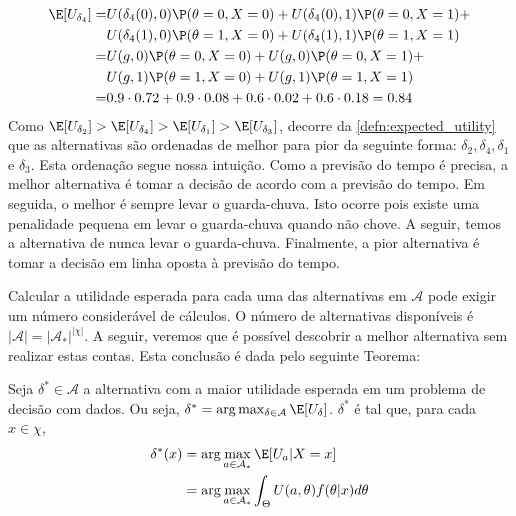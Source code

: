 \begin{example}
\begin{align*}
 \end{align*}
 \begin{align*}
  \E[U_{\delta_{4}}]
  =& U(\delta_{4}(0),0)\P(\theta=0,X=0) +
  U(\delta_{4}(0),1)\P(\theta=0,X=1) + \\
  & U(\delta_{4}(1),0)\P(\theta=1,X=0) +
  U(\delta_{4}(1),1)\P(\theta=1,X=1) \\
  =& U(g,0)\P(\theta=0,X=0) +
  U(g,0)\P(\theta=0,X=1) + \\
  & U(g,1)\P(\theta=1,X=0) +
  U(g,1)\P(\theta=1,X=1) \\
  =& 0.9 \cdot 0.72 + 0.9 \cdot 0.08
  + 0.6 \cdot 0.02 + 0.6 \cdot 0.18 = 0.84
 \end{align*}
 Como $\E[U_{\delta_{2}}] > \E[U_{\delta_{4}}] > \E[U_{\delta_{1}}] > \E[U_{\delta_{3}}]$,
 decorre da \cref{defn:expected_utility} que as 
 alternativas são ordenadas de melhor para
 pior da seguinte forma:
 $\delta_{2}, \delta_{4}, \delta_{1}$ e $\delta_{3}$.
 Esta ordenação segue nossa intuição.
 Como a previsão do tempo é precisa,
 a melhor alternativa é tomar a decisão de
 acordo com a previsão do tempo.
 Em seguida, o melhor é sempre levar o guarda-chuva.
 Isto ocorre pois existe uma penalidade pequena em
 levar o guarda-chuva quando não chove.
 A seguir, temos a alternativa de nunca
 levar o guarda-chuva.
 Finalmente, a pior alternativa é tomar a
 decisão em linha oposta à previsão do tempo.
\end{example}

Calcular a utilidade esperada para cada uma das alternativas em $\mathcal{A}$
pode exigir um número considerável de cálculos.
O número de alternativas disponíveis é
$|\mathcal{A}| = |\mathcal{A}_{*}|^{|\chi|}$. 
A seguir, veremos que é possível descobrir a melhor alternativa sem realizar estas contas.
Esta conclusão é dada pelo seguinte Teorema:

\begin{theorem}
 \label{theorem:extensive-form}
 Seja $\delta^{*} \in \mathcal{A}$ a alternativa com a
 maior utilidade esperada em um
 problema de decisão com dados.
 Ou seja, $\delta^{*} = \arg\max_{\delta \in \mathcal{A}}\E[U_{\delta}]$.
 $\delta^{*}$ é tal que, para cada $x \in \chi$,
 \begin{align*}
  \delta^{*}(x)
  &= \arg\max_{a \in \mathcal{A}_{*}}\E[U_{a}|X=x] \\
  &= \arg\max_{a \in \mathcal{A}_{*}}\int_{\Theta
  }{U(a,\theta)f(\theta|x)d\theta}
 \end{align*}
\end{theorem}

